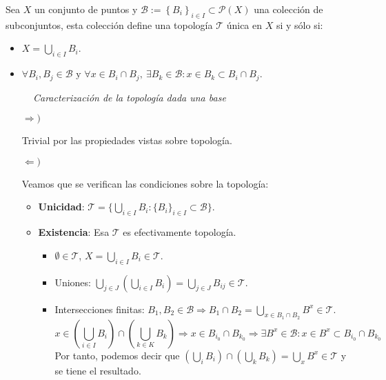 \begin{prop}
Sea $X$ un conjunto de puntos y $\mathcal{B} := \left\{ B_i \right\}_{i \in I} \subset \mathcal{P}\left( X \right)$ una colección de subconjuntos, esta colección define una topología $\mathcal{T}$ única en $X$ si y sólo si: 
\begin{itemize}
    \item $X = \bigcup_{i\in I} B_i$.
    \item $\forall B_i,B_j\in \mathcal{B} \mbox{ y } \forall x \in B_i \cap B_j, \ \exists B_k \in \mathcal{B} : x\in B_k\subset B_i \cap B_j$.
\end{itemize}
\begin{figure}[H]
    \centering
    \caption{\textit{Caracterización de la topología dada una base}}
    \label{fig:caracterización-de-la-topología-dada-una-base}
\end{figure}

\end{prop}
\begin{demo}
\begin{itemize}
\item[$\Rightarrow)$]

Trivial por las propiedades vistas sobre topología.

\item[$\Leftarrow)$]

Veamos que se verifican las condiciones sobre la topología:
\begin{itemize}
    \item \textbf{Unicidad}: $\mathcal{T} = \{\bigcup_{i \in  I} B_i: \{B_i\}_{i \in I} \subset \mathcal{B}\}$.
    \item \textbf{Existencia}: Esa $\mathcal{T}$ es efectivamente topología. 
        \begin{itemize}
            \item $\emptyset \in \mathcal{T}$, $X = \bigcup_{i\in I} B_i \in \mathcal{T}$.
            \item Uniones: $\bigcup_{j\in J} \left(\bigcup_{i\in I} B_{i}\right) = \bigcup_{j\in J} B_{ij} \in \mathcal{T}$. 
            \item Intersecciones finitas: $B_1, B_2 \in \mathcal{B} \Rightarrow B_1 \cap B_2 = \bigcup_{x \in B_1 \cap B_2} B^x \in \mathcal{T}$.
            $$
            x \in \left( \bigcup_{i \in I} B_i \right) \cap \left( \bigcup_{k \in K} B_k \right) \Rightarrow x \in B_{i_0} \cap B_{k_0} \Rightarrow \exists B^x \in \mathcal{B} : x\in B^x \subset B_{i_0} \cap B_{k_0}
            $$
            Por tanto, podemos decir que $\left( \bigcup_{i} B_i \right) \cap \left( \bigcup_{k} B_k \right) = \bigcup_{x} B^x \in \mathcal{T}
            $ y se tiene el resultado.
        \end{itemize}
\end{itemize}
\end{itemize}
\end{demo}

